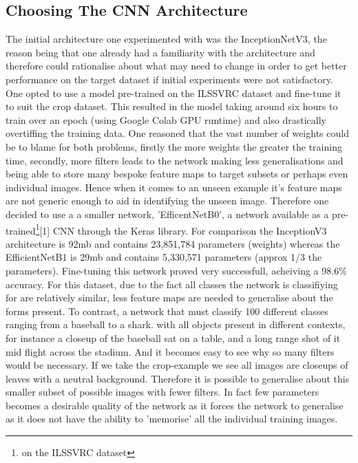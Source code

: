       \subsection{Choosing The CNN Architecture}
      The initial architecture one experimented with was the InceptionNetV3, the reason being that one already had a familiarity with the architecture and therefore could rationalise about what may need to change in order to get better performance on the target dataset if initial experiments were not satisfactory. One opted to use a model pre-trained on the ILSSVRC dataset and fine-tune it to suit the crop dataset. This resulted in the model taking around six hours to train over an epoch (using Google Colab GPU runtime) and also drastically overtiffing the training data. One reasoned that the vast number of weights could be to blame for both problems, firstly the more weights the greater the training time, secondly, more filters leads to the network making less generalisations and being able to store many bespoke feature maps to target subsets or perhaps even individual images. Hence when it comes to an unseen example it's feature maps are not generic enough to aid in identifying the unseen image. Therefore one decided to use a a smaller network, 'EfficentNetB0', a network available as a pre-trained\footnote{on the ILSSVRC dataset}[1] CNN through the Keras library. For comparison  the InceptionV3 architecture is 92mb and contains 23,851,784 parameters (weights) whereas the EfficientNetB1 is 29mb and contains 5,330,571 parameters (approx 1/3 the parameters). Fine-tuning this network proved very successfull, acheiving a 98.6\% accuracy. For this dataset, due to the fact all classes the network is classifiying for are relatively similar, less feature maps are needed to generalise about the forms present. To contrast, a network that must classify 100 different classes ranging from a baseball to a shark. with all objects present in different contexts, for instance a closeup of the baseball sat on a table, and a long range shot of it mid flight across the stadium. And it becomes easy to see why so many filters would be necessary. If we take the crop-example we see all images are closeups of leaves with a neutral background. Therefore it is possible to generalise about this smaller subset of possible images with fewer filters. In fact few parameters becomes a desirable quality of the network as it forces the network to generalise as it does not have the ability to 'memorise' all the individual training images.



